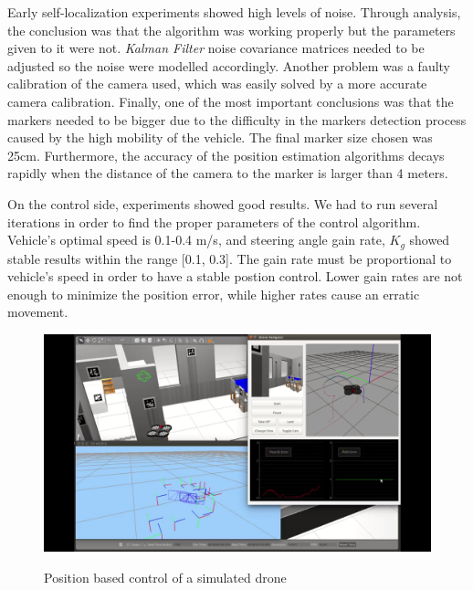\documentclass{styles/svproc}
\begin{document}
	Early self-localization experiments showed high levels of noise. Through analysis, the conclusion was that the algorithm was working properly but the parameters given to it were not. \textit{Kalman Filter} noise covariance matrices needed to be adjusted so the noise were modelled accordingly. Another problem was a faulty calibration of the camera used, which was easily solved by a more accurate camera calibration. Finally, one of the most important conclusions was that the markers needed to be bigger due to the difficulty in the markers detection process caused by the high mobility of the vehicle. The final marker size chosen was 25cm. Furthermore, the accuracy of the position estimation algorithms decays rapidly when the distance of the camera to the marker is larger than 4 meters.
	
	On the control side, experiments showed good results. We had to run several iterations in order to find the proper parameters of the control algorithm. Vehicle's optimal speed is 0.1-0.4 m/s, and steering angle gain rate, $ K_{g}$ showed stable results within the range [0.1, 0.3]. The gain rate must be proportional to vehicle's speed in order to have a stable postion control. Lower gain rates are not enough to minimize the position error, while higher rates cause an erratic movement.
	
	\begin{figure}[h]
		\begin{center}
                {\includegraphics[width=12cm]{simnavigation.png}}
		\end{center}
                \label{fig:simnavigation}
		\caption{Position based control of a simulated drone}
	\end{figure}
\end{document}
